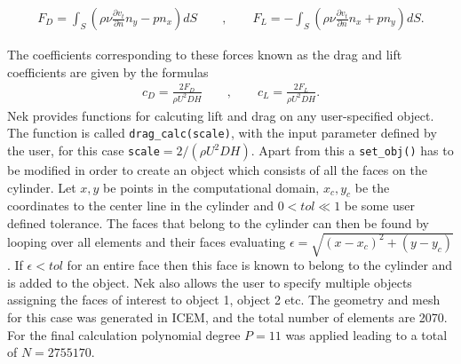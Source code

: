 \begin{align}
    F_D = \int_{S}(\rho \nu \frac{\partial v_t}{\partial n}n_y-pn_x)dS 
    \qquad , \qquad
    F_L = -\int_{S}(\rho \nu \frac{\partial v_t}{\partial n}n_x+pn_y)dS.
    \label{eq:dragnlift}
\end{align}

The coefficients corresponding to these forces known as the drag and lift coefficients 
are given by the formulas 
\begin{align}
    c_D = \frac{2F_D}{\rho U^2 D H}
    \qquad , \qquad
    c_L = \frac{2F_L}{\rho U^2 D H}.
    \label{eq:dragnliftcoeffs}
\end{align}
Nek provides functions for calcuting lift and drag on any user-specified object.
The function is called \verb|drag_calc(scale)|, with the input parameter 
defined by the user, for this case \verb|scale|$=2/(\rho U^2DH)$.  
Apart from this a \verb|set_obj()| has to be modified in order to create an object 
which consists of all the faces on the cylinder.
Let $x,y$ be points in the computational domain, $x_c,y_c$ be the coordinates to the 
center line in the cylinder and $0<tol\ll1$ be some user defined tolerance. The faces that belong to the cylinder can then be found by 
looping over all elements and their faces evaluating $\epsilon = \sqrt{(x-x_c)^2+(y-y_c)}$.
If $\epsilon < tol$ for an entire face then this face is known to 
belong to the cylinder and is added to the object. Nek also allows the user to specify multiple objects 
assigning the faces of interest to object 1, object 2 etc. The geometry and mesh 
for this case was generated in ICEM, and the total number of elements are 2070. 
For the final calculation polynomial degree $P = 11$ was applied leading to a 
total of $N = 2755170$.

